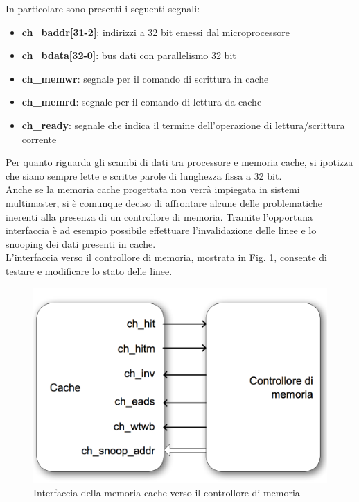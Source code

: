 In particolare sono presenti i seguenti segnali:
\begin{itemize} %
\item \textbf{ch\_baddr[31-2]}: indirizzi a 32 bit emessi dal microprocessore
\item \textbf{ch\_bdata[32-0]}: bus dati con parallelismo 32 bit 
\item \textbf{ch\_memwr}: segnale per il comando di scrittura in cache
\item \textbf{ch\_memrd}: segnale per il comando di lettura da cache
\item \textbf{ch\_ready}: segnale che indica il termine dell'operazione di lettura/scrittura corrente
\end{itemize}

Per quanto riguarda gli scambi di dati tra processore e memoria cache, si ipotizza che siano sempre lette e scritte parole di lunghezza fissa a 32 bit.\\

Anche se la memoria cache progettata non verr\`a impiegata in sistemi multimaster, si \`e comunque deciso di affrontare alcune delle problematiche inerenti alla presenza di un controllore di memoria. Tramite l'opportuna interfaccia \`e ad esempio possibile effettuare l'invalidazione delle linee e lo snooping dei dati presenti in cache.\\

L'interfaccia verso il controllore di memoria, mostrata in Fig. \ref{fig:int_cnt}, consente di testare e modificare lo stato delle linee.\\

\begin{figure}[h!]
\centering
\includegraphics[width=\textwidth]{img/cache/control.png}
\caption{Interfaccia della memoria cache verso il controllore di memoria}
\label{fig:int_cnt}
\end{figure}

